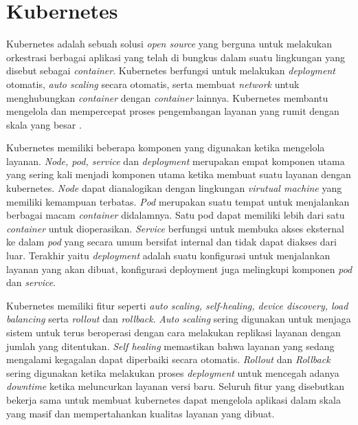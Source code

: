 \section{Kubernetes}

Kubernetes adalah sebuah solusi \textit{open source} yang berguna untuk melakukan orkestrasi berbagai aplikasi yang telah di bungkus dalam suatu lingkungan yang disebut sebagai \textit{container}. Kubernetes berfungsi untuk melakukan \textit{deployment} otomatis, \textit{auto scaling} secara otomatis, serta membuat \textit{network} untuk menghubungkan \textit{container} dengan \textit{container} lainnya. Kubernetes membantu mengelola dan mempercepat proses pengembangan layanan yang rumit dengan skala yang besar \parencite{helmkubernetes}.

Kubernetes memiliki beberapa komponen yang digunakan ketika mengelola layanan. \textit{Node, pod, service} dan \textit{deployment} merupakan empat komponen utama yang sering kali menjadi komponen utama ketika membuat suatu layanan dengan kubernetes. \textit{Node} dapat dianalogikan dengan lingkungan \textit{virutual machine} yang memiliki kemampuan terbatas. \textit{Pod} merupakan suatu tempat untuk menjalankan berbagai macam \textit{container} didalamnya. Satu pod dapat memiliki lebih dari satu \textit{container} untuk dioperasikan. \textit{Service} berfungsi untuk membuka akses eksternal ke dalam \textit{pod} yang secara umum bersifat internal dan tidak dapat diakses dari luar. Terakhir yaitu \textit{deployment} adalah suatu konfigurasi untuk menjalankan layanan yang akan dibuat, konfigurasi deployment juga melingkupi komponen \textit{pod} dan \textit{service}.

Kubernetes memiliki fitur seperti \textit{auto scaling, self-healing, device discovery, load balancing} serta \textit{rollout} dan \textit{rollback}. \textit{Auto scaling} sering digunakan untuk menjaga sistem untuk terus beroperasi dengan cara melakukan replikasi layanan dengan jumlah yang ditentukan. \textit{Self healing} memastikan bahwa layanan yang sedang mengalami kegagalan dapat diperbaiki secara otomatis. \textit{Rollout} dan \textit{Rollback} sering digunakan ketika melakukan proses \textit{deployment} untuk mencegah adanya \textit{downtime} ketika meluncurkan layanan versi baru. Seluruh fitur yang disebutkan bekerja sama untuk membuat kubernetes dapat mengelola aplikasi dalam skala yang masif dan mempertahankan kualitas layanan yang dibuat.


